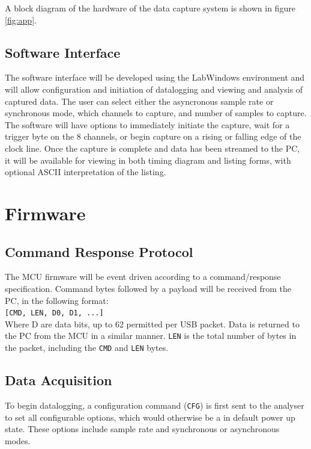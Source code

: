 \documentclass[11pt]{article}
\begin{document}
    A block diagram of the hardware of the data capture system is shown in figure \ref{fig:app}.
    
\subsection{Software Interface}
    The software interface will be developed using the LabWindows environment and will allow configuration and initiation of datalogging and viewing and analysis of captured data.  The user can select either the asyncronous sample rate or synchronous mode, which channels to capture, and number of samples to capture.  The software will have options to immediately initiate the capture, wait for a trigger byte on the 8 channels, or begin capture on a rising or falling edge of the clock line.  Once the capture is complete and data has been streamed to the PC, it will be available for viewing in both timing diagram and listing forms, with optional ASCII interpretation of the listing.

\section{Firmware}
\subsection{Command Response Protocol}
    The MCU firmware will be event driven according to a command/response
    specification. Command bytes followed by a payload will be received from the
    PC, in the following format: \\

    \texttt{[CMD, LEN, D0, D1,  ...]} \\

    Where D are data bits, up to 62 permitted per USB packet. Data is returned
    to the PC from the MCU in a similar manner. \texttt{LEN} is the total number
    of bytes in the packet, including the \texttt{CMD} and \texttt{LEN} bytes.

\subsection{Data Acquisition}
    To begin datalogging, a configuration command (\texttt{CFG}) 
    is first sent to the analyser
    to set all configurable options, which would otherwise be a in default power
    up state. These options include sample rate and synchronous or asynchronous
    modes.
\end{document}
